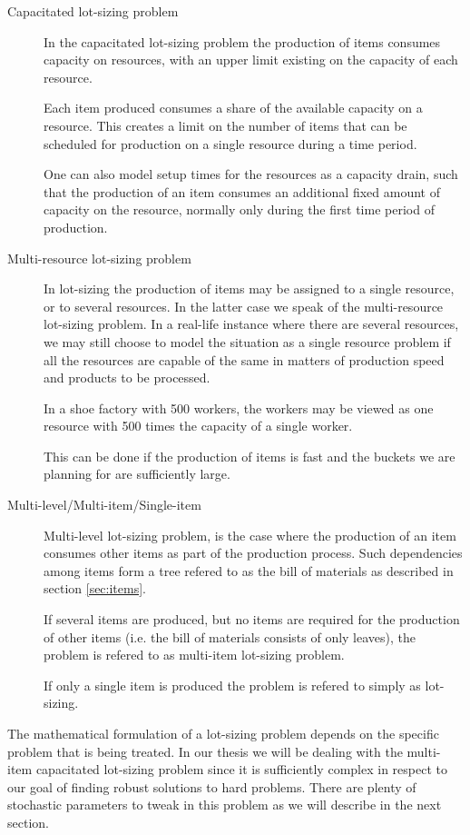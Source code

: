 \begin{description}

\item[Capacitated lot-sizing problem] In the capacitated lot-sizing
problem the production of items consumes capacity on resources,
with an upper limit existing on the capacity of each resource.

Each item produced consumes a share of the available capacity on a
resource. This creates a limit on the number of items that can
be scheduled for production on a single resource during a time period.

One can also model setup times for the resources as a capacity drain,
such that the production of an item consumes an additional fixed
amount of capacity on the resource, normally only during the first
time period of production.

\item[Multi-resource lot-sizing problem] In lot-sizing the production of
items may be assigned to a single resource, or to several
resources. In the latter case we speak of the multi-resource
lot-sizing problem. In a real-life instance
where there are several resources, we may still choose to model the
situation as a single resource problem if all the resources are
capable of the same in matters of production speed and products to be
processed. 
\begin{example}
In a shoe factory with 500 workers, the workers may be viewed as one
resource with 500 times the capacity of a single worker. 
\end{example}
This can be done if the production of items is fast and the buckets we
are planning for are sufficiently large.

\item[Multi-level/Multi-item/Single-item] Multi-level lot-sizing problem,
 is the case where the production of an item consumes other
items as part of the production process. Such dependencies among items
form a tree refered to as the bill of materials as described in
section \ref{sec:items}.

If several items are produced, but no items are required for the
production of other items (i.e. the bill of materials consists of only
leaves), the problem is refered to as multi-item lot-sizing problem.

If only a single item is produced the problem is refered to simply as
lot-sizing.
\end{description}

The mathematical formulation of a lot-sizing problem depends on the
specific problem that is being treated. In our thesis we will be
dealing with the multi-item capacitated lot-sizing problem since it is
sufficiently complex in respect to our goal of finding robust
solutions to hard problems. There are plenty of stochastic parameters to tweak in this
problem as we will describe in the next section.


